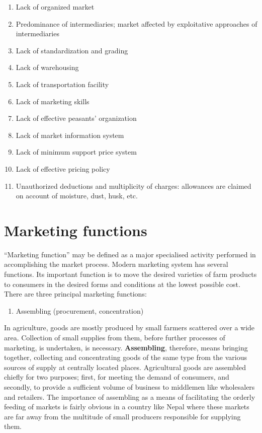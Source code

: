 \documentclass[11pt,]{book}
\providecommand{\tightlist}{%
  \setlength{\itemsep}{0pt}\setlength{\parskip}{0pt}}
\theoremstyle{definition}
\theoremstyle{definition}
\theoremstyle{definition}
\theoremstyle{remark}
\begin{document}
\begin{enumerate}
\def\labelenumi{\arabic{enumi}.}
\tightlist
\item
  Lack of organized market
\item
  Predominance of intermediaries; market affected by exploitative
  approaches of intermediaries
\item
  Lack of standardization and grading
\item
  Lack of warehousing
\item
  Lack of transportation facility
\item
  Lack of marketing skills
\item
  Lack of effective peasants' organization
\item
  Lack of market information system
\item
  Lack of minimum support price system
\item
  Lack of effective pricing policy
\item
  Unauthorized deductions and multiplicity of charges: allowances are
  claimed on account of moisture, dust, husk, etc.
\end{enumerate}

\section{Marketing functions}\label{marketing-functions}

``Marketing function'' may be defined as a major specialised activity
performed in accomplishing the market process. Modern marketing system
has several functions. Its important function is to move the desired
varieties of farm products to consumers in the desired forms and
conditions at the lowest possible cost. There are three principal
marketing functions:

\begin{enumerate}
\def\labelenumi{\arabic{enumi}.}
\tightlist
\item
  Assembling (procurement, concentration)
\end{enumerate}

In agriculture, goods are mostly produced by small farmers scattered
over a wide area. Collection of small supplies from them, before further
processes of marketing, is undertaken, is necessary.
\textbf{Assembling}, therefore, means bringing together, collecting and
concentrating goods of the same type from the various sources of supply
at centrally located places. Agricultural goods are assembled chiefly
for two purposes; first, for meeting the demand of consumers, and
secondly, to provide a sufficient volume of business to middlemen like
wholesalers and retailers. The importance of assembling as a means of
facilitating the orderly feeding of markets is fairly obvious in a
country like Nepal where these markets are far away from the multitude
of small producers responsible for supplying them.
\end{document}
